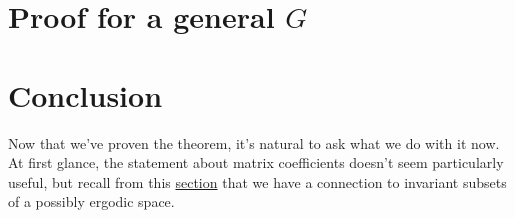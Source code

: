 \documentclass[
  12pt
]{article}
\theoremstyle{break}
\theoremstyle{plain}
\begin{document}


\hypertarget{proof-for-a-general-G}{%
\section{Proof for a general \texorpdfstring{$G$}{G}}\label{proof-for-a-general-G}}





\hypertarget{outro}{%
\section{Conclusion}\label{outro}}


  Now that we've proven the theorem, it's natural to ask what we do with it now.
  At first glance, the statement about matrix coefficients doesn't seem particularly useful,
  but recall from this \hyperref[the-connection-between-ergodicity-and-unitary-representations]{section}
  that we have a connection to invariant subsets of a possibly ergodic space.
\end{document}
